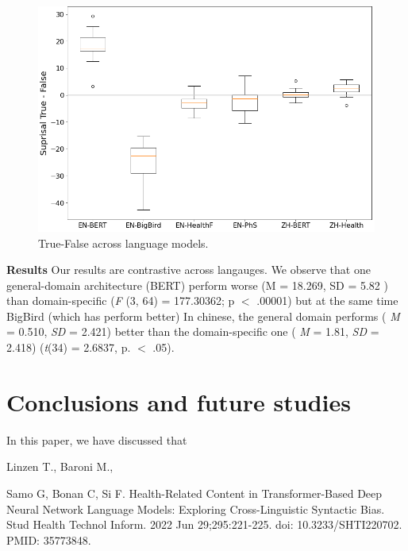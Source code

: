 \documentclass{IOS-Book-Article}
\begin{document}
\begin{figure}
    \centering
    \includegraphics[scale=0.35]{graphmatplot}
    \caption{True-False across language models. }
    \label{fig:my_label}
\end{figure}

\noindent \textbf{Results} Our results are contrastive across langauges. We observe that one general-domain architecture (BERT) perform worse (M = 18.269, SD = 5.82 ) than domain-specific (\textit{F} (3, 64) = 177.30362; p $<$ .00001) but at the same time BigBird (which has perform better) In chinese, the general domain performs ( \textit{M} = 0.510, \textit{SD} = 2.421) better than the domain-specific one ( \textit{M} = 1.81, \textit{SD} = 2.418) (\textit{t}(34) = 2.6837, p. $<$ .05).

\section{Conclusions and future studies}
In this paper, we have discussed that 

\begin{thebibliography}{99}


Linzen T., Baroni M., 

Samo G, Bonan C, Si F. Health-Related Content in Transformer-Based Deep Neural Network Language Models: Exploring Cross-Linguistic Syntactic Bias. Stud Health Technol Inform. 2022 Jun 29;295:221-225. doi: 10.3233/SHTI220702. PMID: 35773848.

\end{thebibliography}
\end{document}
